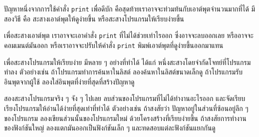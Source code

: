 
ปัญหาหนึ่งจากการใช้คำสั่ง \texttt{print}
เพื่อดีบัก คือสุดท้ายเราอาจจะท่วมท้นกับเอาต์พุตจำนวนมากที่ได้
มีสองวิธี คือ
สะสางเอาต์พุตให้ดูง่ายขึ้น หรือสะสางโปรแกรมให้เรียบง่ายขึ้น


เพื่อสะสางเอาต์พุต
เราอาจจะเอาคำสั่ง \texttt{print} ที่ไม่ได้ช่วยเท่าไรออก 
ซึ่งอาจจะลบออกเลย หรืออาจจะคอมเมนต์มันออก
หรือเราอาจจะปรับให้คำสั่ง \texttt{print}
พิมพ์เอาต์พุตที่ดูง่ายขึ้นออกมาแทน


เพื่อสะสางโปรแกรมให้เรียบง่าย
มีหลาย ๆ อย่างที่ทำได้
ได้แก่ หนึ่งสะสางโดยจำกัดโจทย์ที่โปรแกรมทำลง
ตัวอย่างเช่น 
ถ้าโปรแกรมทำการค้นหาในลิสต์
ลองค้นหาในลิสต์ขนาดเล็กดู
ถ้าโปรแกรมรับอินพุตจากผู้ใช้
ลองใส่อินพุตที่ง่ายที่สุดที่สร้างปัญหาดู


สองสะสางโปรแกรมจริง ๆ จัง ๆ ไปเลย
ลบส่วนของโปรแกรมที่ไม่ได้ทำงานอะไรออก
และจัดเรียบเรียงโปรแกรมให้อ่านได้ง่ายที่สุดเท่าที่ทำได้
ตัวอย่างเช่น 
ถ้าสงสัยว่า ปัญหาอยู่ในส่วนที่ซ้อนอยู่ลึก ๆ ของโปรแกรม
ลองเขียนส่วนนั้นของโปรแกรมใหม่ ด้วยโครงสร้างที่เรียบง่ายขึ้น
ถ้าสงสัยการทำงานของฟังก์ชันใหญ่
ลองแตกมันออกเป็นฟังก์ชันเล็ก ๆ  และทดสอบแต่ละฟังก์ชันแยกกันดู



